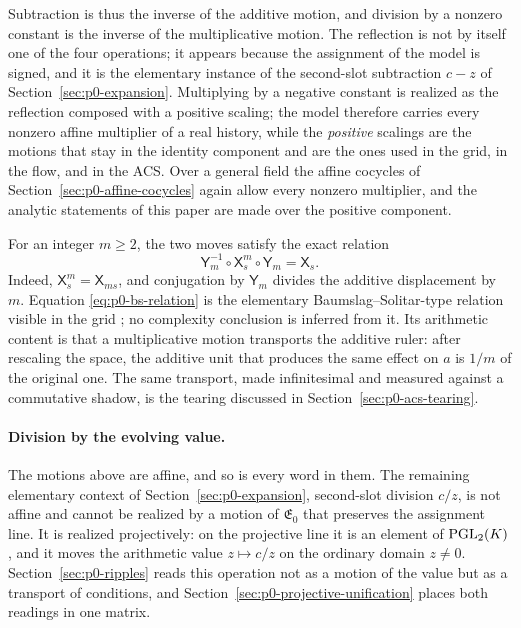 Subtraction is thus the inverse of the additive motion, and division by a
nonzero constant is the inverse of the multiplicative motion.  The reflection is
not by itself one of the four operations; it appears because the assignment of
the model is signed, and it is the elementary instance of the second-slot
subtraction $c-z$ of Section~\ref{sec:p0-expansion}.  Multiplying by a negative
constant is realized as the reflection composed with a positive scaling; the
model therefore carries every nonzero affine multiplier of a real history, while
the \emph{positive} scalings are the motions that stay in the identity component and
are the ones used in the grid, in the flow, and in the ACS.  Over a general field
the affine cocycles of Section~\ref{sec:p0-affine-cocycles} again allow every
nonzero multiplier, and the analytic statements of this paper are made over the
positive component.

For an integer $m\ge2$, the two moves satisfy the exact relation
\begin{equation}\label{eq:p0-bs-relation}
  \mathsf Y_m^{-1}\circ\mathsf X_s^m\circ\mathsf Y_m
  =\mathsf X_s.
\end{equation}
Indeed, $\mathsf X_s^m=\mathsf X_{ms}$, and conjugation by $\mathsf Y_m$
divides the additive displacement by $m$.  Equation
\eqref{eq:p0-bs-relation} is the elementary Baumslag--Solitar-type relation
visible in the grid \cite{BaumslagSolitar1962NonHopfian}; no complexity
conclusion is inferred from it.  Its arithmetic content is that a
multiplicative motion transports the additive ruler: after rescaling the
space, the additive unit that produces the same effect on $a$ is $1/m$ of the
original one.  The same transport, made infinitesimal and measured against a
commutative shadow, is the tearing discussed in
Section~\ref{sec:p0-acs-tearing}.

\paragraph{Division by the evolving value.}
The motions above are affine, and so is every word in them.  The remaining
elementary context of Section~\ref{sec:p0-expansion}, second-slot division
$c/z$, is not affine and cannot be realized by a motion of $\mathfrak E_0$ that
preserves the assignment line.  It is realized projectively: on the projective
line it is an element of $\operatorname{PGL}_2(K)$, and it moves the arithmetic value
$z\mapsto c/z$ on the ordinary domain $z\ne0$.  Section~\ref{sec:p0-ripples}
reads this operation not as a motion of the value but as a transport of
conditions, and Section~\ref{sec:p0-projective-unification} places both
readings in one matrix.


